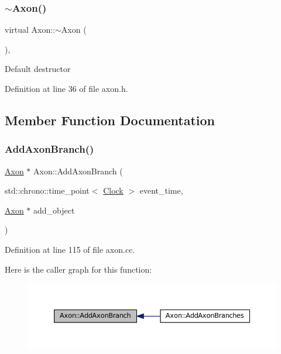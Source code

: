 \subsubsection{\texorpdfstring{$\sim$\+Axon()}{~Axon()}}
{\footnotesize\ttfamily virtual Axon\+::$\sim$\+Axon (\begin{DoxyParamCaption}{ }\end{DoxyParamCaption})\hspace{0.3cm}{\ttfamily [inline]}, {\ttfamily [virtual]}}

Default destructor 

Definition at line 36 of file axon.\+h.



\subsection{Member Function Documentation}
\mbox{\label{class_axon_a6ed85466115dab46ef71f26a420249ff}} 
\subsubsection{\texorpdfstring{Add\+Axon\+Branch()}{AddAxonBranch()}}
{\footnotesize\ttfamily \mbox{\hyperlink{class_axon}{Axon}} $\ast$ Axon\+::\+Add\+Axon\+Branch (\begin{DoxyParamCaption}\item[{std\+::chrono\+::time\+\_\+point$<$ \mbox{\hyperlink{universe_8h_a0ef8d951d1ca5ab3cfaf7ab4c7a6fd80}{Clock}} $>$}]{event\+\_\+time,  }\item[{\mbox{\hyperlink{class_axon}{Axon}} $\ast$}]{add\+\_\+object }\end{DoxyParamCaption})}



Definition at line 115 of file axon.\+cc.

Here is the caller graph for this function\+:\nopagebreak
\begin{figure}[H]
\begin{center}
\leavevmode
\includegraphics[width=350pt]{class_axon_a6ed85466115dab46ef71f26a420249ff_icgraph}
\end{center}
\end{figure}
\mbox{\label{class_axon_a04969d98c3fbb671cba5daccacffc003}} 
